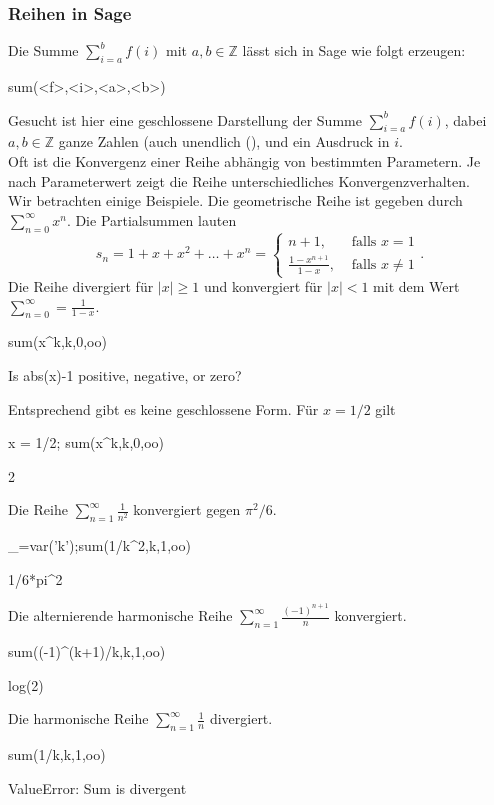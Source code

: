 \documentclass[fontsize=12pt,paper=a4,twoside,bibtotoc,idxtotoc,
liststotoc,pagesize,BCOR1.2cm,DIV15,chapterprefix,pagesize=pdftex]{scrbook}
\theoremstyle{plain}
\theoremstyle{definition}
\theoremstyle{remark}
\begin{document}
\subsubsection{Reihen in Sage}
Die Summe $\sum_{i=a}^b f(i)$ mit $a,b \in \mathbb{Z}$ lässt sich in Sage wie folgt erzeugen:
\begin{sagein}
sum(<f>,<i>,<a>,<b>) 
\end{sagein}
Gesucht ist hier eine geschlossene Darstellung der Summe $\sum_{i=a}^b f(i)$, dabei $a,b \in \mathbb{Z}$ ganze
Zahlen (auch unendlich (), und  ein Ausdruck in $i$.\\
Oft ist die Konvergenz einer Reihe abhängig von bestimmten Parametern. Je nach Parameterwert zeigt die Reihe
unterschiedliches Konvergenzverhalten.\\
Wir betrachten einige Beispiele.
Die geometrische Reihe ist gegeben durch $\sum_{n=0}^\infty x^n$. Die
Partialsummen lauten
\[ s_n=1+x+x^2+\ldots + x^n = \left \{ \begin{array}{ll}
n+1, & \mbox{ falls } x=1\\
\frac{1-x^{n+1}}{1-x}, & \mbox{ falls } x \neq 1 
\end{array} \right. .\]
Die Reihe divergiert für $|x|\geq1$ und konvergiert für $|x|<1$ mit
dem Wert $\sum_{n=0}^\infty = \frac{1}{1-x}$.
\begin{sagein}
sum(x^k,k,0,oo)
\end{sagein}
\begin{sageout}
Is  abs(x)-1  positive, negative, or zero?
\end{sageout}
Entsprechend gibt es keine geschlossene Form. Für $x=1/2$ gilt
\begin{sagein}
x = 1/2; sum(x^k,k,0,oo)
\end{sagein}
\begin{sageout}
  2
\end{sageout}
 Die Reihe $\sum_{n=1}^\infty \frac{1}{n^2}$ konvergiert gegen
$\pi^2/6$.
\begin{sagein}
_=var('k');sum(1/k^2,k,1,oo)
\end{sagein}
\begin{sageout}
1/6*pi^2
\end{sageout}
 Die alternierende harmonische Reihe  $\sum_{n=1}^\infty
\frac{(-1)^{n+1}}{n}$ konvergiert.
\begin{sagein}
sum((-1)^(k+1)/k,k,1,oo)
\end{sagein}
\begin{sageout}
  log(2)
\end{sageout}
 Die harmonische Reihe $\sum_{n=1}^\infty \frac{1}{n}$
 divergiert.
\begin{sagein}
sum(1/k,k,1,oo)
\end{sagein}
\begin{sageout}
ValueError: Sum is divergent
\end{sageout}
\end{document}
